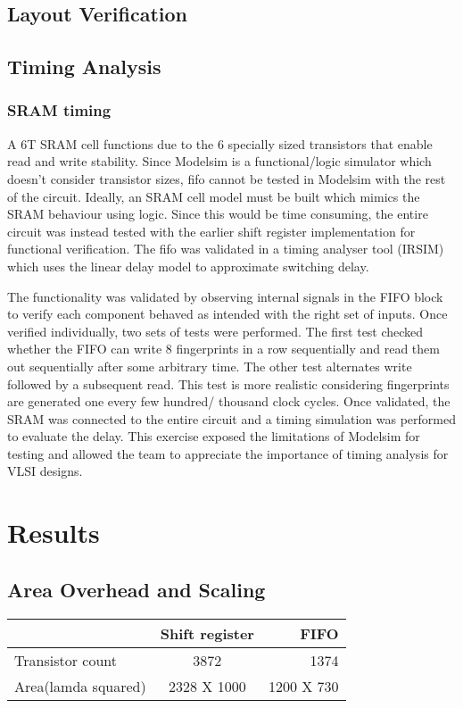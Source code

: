 \documentclass[10pt,journal,compsoc]{IEEEtran}
\begin{document}
\subsection{Layout Verification}
\subsection{Timing Analysis}

\subsubsection {\qquad  SRAM timing}
A 6T SRAM cell functions due to the 6 specially sized transistors that enable read and write stability. Since Modelsim is a functional/logic simulator which doesn’t consider transistor sizes, fifo cannot be tested in Modelsim with the rest of the circuit. Ideally, an SRAM cell model must be built which mimics the SRAM behaviour using logic. Since this would be time consuming, the entire circuit was instead tested with the earlier shift register implementation for functional verification. The fifo was validated in a timing analyser tool (IRSIM) which uses the linear delay model to approximate switching delay. 

The functionality was validated by observing internal signals in the FIFO block to verify each component behaved as intended with the right set of inputs. Once verified individually, two sets of tests were performed. The first test checked whether the FIFO can write 8 fingerprints in a row sequentially and read them out sequentially after some arbitrary time. The other test alternates write followed by a subsequent read. This test is more realistic considering fingerprints are generated one every few hundred/ thousand clock cycles. Once validated, the SRAM was connected to the entire circuit and a timing simulation was performed to evaluate the delay.
 This exercise exposed the limitations of Modelsim for testing and allowed the team to appreciate the importance of timing analysis for VLSI designs.


\section{Results}
\subsection{Area Overhead and Scaling}


\begin{center}
  \begin{tabular}{ l || c | r }
    \hline
     & Shift register & FIFO  \\ \hline
    Transistor count & 3872 & 1374 \\ \hline
    Area(lamda squared) & 2328 X 1000  & 1200 X 730 \\
    \hline
  \end{tabular}
\end{center}
\end{document}
